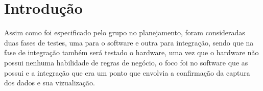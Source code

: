 \section{Introdução}
\label{Sec:6-introducao}

Assim como foi especificado pelo grupo no planejamento, foram consideradas duas fases de testes, uma para o software e outra para integração, sendo que na fase de integração também será testado o hardware, uma vez que o hardware não possui nenhuma habilidade de regras de negócio, o foco foi no software que as possui e a integração que era um ponto que envolvia a confirmação da captura dos dados e sua vizualização.


